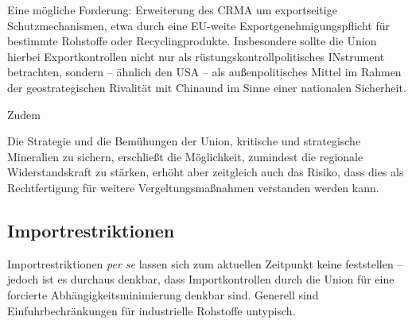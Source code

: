 \documentclass[12pt,a4paper,oneside]{book} %
\begin{document}
Eine mögliche Forderung: Erweiterung des CRMA um exportseitige Schutzmechanismen, etwa durch eine EU-weite Exportgenehmigungspflicht für bestimmte Rohstoffe oder Recyclingprodukte. Insbesondere sollte die Union hierbei Exportkontrollen nicht nur als rüstungskontrollpolitisches INstrument betrachten, sondern -- ähnlich den USA -- als \glqq außenpolitisches Mittel im Rahmen der geostrategischen Rivalität mit China\grqq und im Sinne einer nationalen Sicherheit.\autocite{Medunic, Nr 15 Juli 2024, S. 3}

Zudem 

Die Strategie und die Bemühungen der Union, kritische und strategische Mineralien zu sichern, erschließt die Möglichkeit, zumindest die regionale Widerstandskraft zu stärken, erhöht aber zeitgleich auch das Risiko, dass dies als Rechtfertigung für weitere Vergeltungsmaßnahmen verstanden werden kann.\autocite[siehe auch]{Schroeder, Patrick: Letter: Race for critical minerals sparks call for new materials agency, FT, July 14 2025}



\subsection{Importrestriktionen}
Importrestriktionen \textit{per se} lassen sich zum aktuellen Zeitpunkt keine feststellen -- jedoch ist es durchaus denkbar, dass Importkontrollen durch die Union für eine forcierte Abhängigkeitsminimierung denkbar sind. Generell sind Einfuhrbechränkungen für industrielle Rohstoffe untypisch.\autocite{Schorkopf, Rohstoffverwaltung, Rn. 37}
\end{document}
